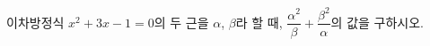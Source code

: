 이차방정식 $x^2+3x-1=0$의 두 근을 $\alpha$, $\beta$라 할 때, $\dfrac{\alpha^2}{\beta}+\dfrac{\beta^2}{\alpha}$의 값을 구하시오.
